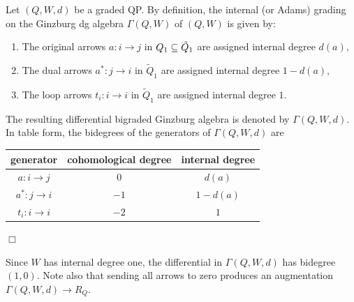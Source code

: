\begin{definition}\label{def:bigradedGinzburg} Let \((Q,W,d)\) be a graded QP. By definition, the internal (or Adams) grading on the Ginzburg dg algebra $\Gamma(Q,W)$ of $(Q,W)$ is given by:
\begin{enumerate}
    \item The original arrows $a:i\to j$ in $Q_1\subseteq \tilde{Q}_1$ are assigned internal degree $d(a)$,
    \item The dual arrows $a^*:j\to i$ in $\tilde{Q}_1$ are assigned internal degree $1-d(a)$,
    \item The loop arrows $t_i:i\to i$ in $\tilde{Q}_1$ are assigned internal degree $1$.
\end{enumerate}
The resulting differential bigraded Ginzburg algebra is denoted by $\Gamma(Q,W,d)$. In table form, the bidegrees of the generators of $\Gamma(Q,W,d)$ are
\begin{center}
\begin{tabular}{c|c|c}\label{table:gradings}
 generator & cohomological degree & internal degree\\
\midrule
 \(a:i\to j\) & \(0\) & \(d(a)\)\\
 \(a^*:j\to i\) & \(-1\) & \(1-d(a)\)\\
 \(t_i:i\to i\) & \(-2\) & \(1\)
\end{tabular}
\end{center}
\hfill$\Box$
\end{definition}

\noindent Since \(W\) has internal degree one, the differential in $\Gamma(Q,W,d)$ has bidegree
\((1,0)\). Note also that sending all arrows to zero produces an augmentation $\Gamma(Q,W,d)\to R_Q$.

